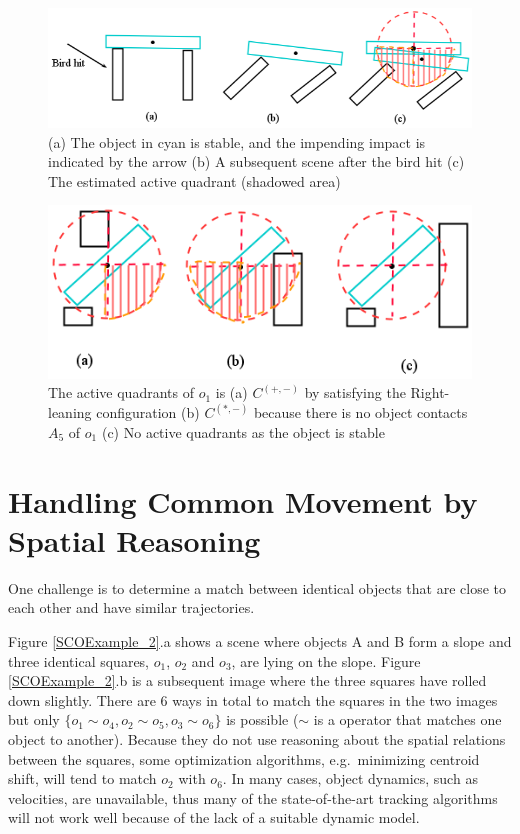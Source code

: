 \documentclass[letterpaper]{article}
\begin{document}
\begin{figure}[h!]
\centering\includegraphics[scale=0.35]{BirdImpact.png}\caption{(a) The object in cyan is stable, and the impending impact is indicated by the arrow (b) A subsequent scene after the bird hit (c) The estimated active quadrant (shadowed area)}
\label{BirdImpact}
\end{figure}

\begin{figure}[h!]
\centering\includegraphics[scale=0.35]{ScenarioByRules.png}\caption{ The active quadrants of $o_1$ is (a)  $C^{(+,-)}$ by satisfying the Right-leaning configuration (b) $C^{(*,-)}$ because there is no object contacts $A_5$ of $o_1$ (c) No active quadrants as the object is stable}
\label{ScenarioByRules}
\end{figure}

\section{Handling Common Movement by Spatial Reasoning}
\label{CM}

One challenge is to determine a match between identical objects that are close to each other and have similar trajectories.  

Figure \ref{SCOExample_2}.a  shows a scene where objects A and B form a slope and three identical squares, $o_1$, $o_2$ and $o_3$, are lying on the slope. Figure \ref{SCOExample_2}.b is a subsequent image where the three squares have rolled down slightly. There are 6 ways in total to match the squares in the two images but only $\{o_1 \sim o_4, o_2 \sim o_5, o_3 \sim o_6\}$ is possible ($\sim$ is a operator that matches one object to another). Because they do not use reasoning about the spatial relations between the squares, some optimization algorithms, e.g.\ minimizing centroid shift, will tend to match $o_2$ with $o_6$. In many cases, object dynamics, such as velocities, are unavailable, thus many of the state-of-the-art tracking algorithms will not work well because of the lack of a suitable dynamic model. 
\end{document}
